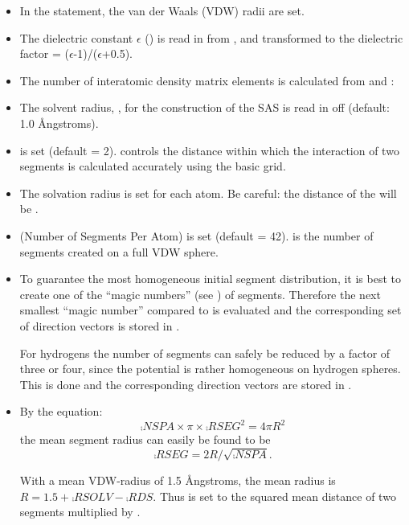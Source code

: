 \begin{itemize}
\item In the  statement, the van der Waals (VDW) radii are set.
\item The dielectric constant $\epsilon$ () is read in from 
, and transformed to the dielectric factor  = 
($\epsilon$-1)/($\epsilon$+0.5).
\item The number of interatomic density matrix elements  is 
calculated from  and :


\item The solvent radius, , for the construction of the SAS is
read in off   (default: 1.0 \AA ngstroms).
\item {} is set (default = 2).   controls the  distance
within which  the interaction of two segments is calculated accurately using
the basic grid.
\item The solvation radius  is set for each atom.  Be careful:  the
distance of the  will be .
\item {} (Number of Segments Per Atom) is set (default = 42).
 is the number of segments created on a full VDW sphere.
\item To guarantee the most homogeneous initial segment distribution, it is
best to create one of the ``magic numbers'' (see ) of segments.
Therefore the next smallest ``magic number'' compared to   is
evaluated and the corresponding set of direction vectors is stored in
.

For hydrogens the number of segments can safely be reduced by a factor of three
or four, since the potential is rather homogeneous on hydrogen spheres. This is
done and the corresponding direction vectors are stored in .

\item By the equation:
$$
\comp{NSPA}\times \pi\times \comp{RSEG}^2 = 4\pi R^2
$$
the mean segment radius can easily be found to be 
$$
\comp{RSEG}=2R/\sqrt{\comp{NSPA}}.
$$

With a mean VDW-radius of 1.5 \AA ngstroms, the mean radius is 
$R=1.5+\comp{RSOLV}-\comp{RDS}$.
Thus  is set to the squared mean distance of 
two segments multiplied by
.
\end{itemize}

